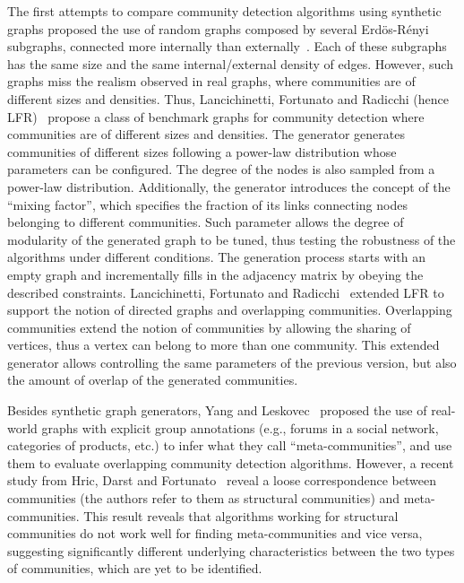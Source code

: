 The first attempts to compare community detection algorithms using synthetic graphs proposed the use of random graphs composed by several Erd\"{o}s-R\'{e}nyi subgraphs, connected more internally than externally~\cite{danon2005comparing}. Each of these subgraphs has the same size and the same internal/external density of edges. However, such graphs miss the realism observed in real graphs, where communities are of different sizes and densities. Thus, Lancichinetti, Fortunato and Radicchi (hence LFR)~\cite{PhysRevE.78.046110} propose a class of benchmark graphs for community detection where communities are of different sizes and densities. The generator generates communities of different sizes following a power-law distribution whose parameters can be configured. The degree of the nodes is also sampled from a power-law distribution. Additionally, the generator introduces the concept of the ``mixing factor'', which specifies the fraction of its links connecting nodes belonging to different communities. Such parameter allows  the degree of modularity of the generated graph  to be tuned, thus testing the robustness of the algorithms under different conditions. The generation process starts with an empty graph and incrementally fills in the adjacency matrix by obeying the described constraints. Lancichinetti, Fortunato and Radicchi~\cite{PhysRevE.80.016118} extended LFR to support the notion of directed graphs and overlapping communities. Overlapping communities extend the notion of communities by allowing the sharing of vertices, thus a vertex can belong to more than one community. This extended generator allows controlling the same parameters of the previous version, but also the amount of overlap of the generated communities.

Besides synthetic graph generators, Yang and Leskovec~\cite{yang2015defining} proposed the use of real-world graphs with explicit group annotations (e.g., forums in a social network, categories of products, etc.) to infer what they call ``meta-communities'', and use them to evaluate overlapping community detection algorithms. However, a recent study from Hric, Darst and Fortunato~\cite{hric2014community} reveal a loose correspondence between  communities (the authors refer to them as structural communities) and meta-communities.  This result reveals that  algorithms working for structural communities do not work well for finding meta-communities and vice versa, suggesting significantly different underlying characteristics between the two types of communities, which are yet to be identified.

